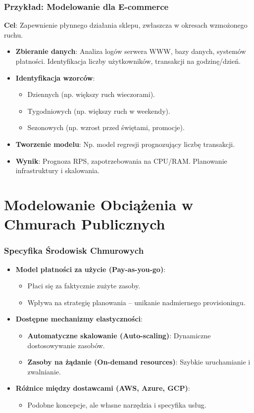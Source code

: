 \documentclass[aspectratio=169,xcolor=table]{beamer}
\begin{document}
\begin{frame}
  \frametitle{Przykład: Modelowanie dla E-commerce}
  \textbf{Cel}: Zapewnienie płynnego działania sklepu, zwłaszcza w okresach wzmożonego ruchu.
  \begin{itemize}
    \item \textbf{Zbieranie danych}: Analiza logów serwera WWW, bazy danych, systemów płatności. Identyfikacja liczby użytkowników, transakcji na godzinę/dzień.
    \item \textbf{Identyfikacja wzorców}:
        \begin{itemize}
            \item Dziennych (np. większy ruch wieczorami).
            \item Tygodniowych (np. większy ruch w weekendy).
            \item Sezonowych (np. wzrost przed świętami, promocje).
        \end{itemize}
    \item \textbf{Tworzenie modelu}: Np. model regresji prognozujący liczbę transakcji.
    \item \textbf{Wynik}: Prognoza RPS, zapotrzebowania na CPU/RAM. Planowanie infrastruktury i skalowania.
  \end{itemize}
\end{frame}

\section{Modelowanie Obciążenia w Chmurach Publicznych}

\begin{frame}
  \frametitle{Specyfika Środowisk Chmurowych}
  \begin{itemize}
    \item \textbf{Model płatności za użycie (Pay-as-you-go)}:
        \begin{itemize}
            \item Płaci się za faktycznie zużyte zasoby.
            \item Wpływa na strategię planowania – unikanie nadmiernego provisioningu.
        \end{itemize}
    \item \textbf{Dostępne mechanizmy elastyczności}:
        \begin{itemize}
            \item \textbf{Automatyczne skalowanie (Auto-scaling)}: Dynamiczne dostosowywanie zasobów.
            \item \textbf{Zasoby na żądanie (On-demand resources)}: Szybkie uruchamianie i zwalnianie.
        \end{itemize}
    \item \textbf{Różnice między dostawcami (AWS, Azure, GCP)}:
        \begin{itemize}
            \item Podobne koncepcje, ale własne narzędzia i specyfika usług.
        \end{itemize}
  \end{itemize}
\end{frame}
\end{document}
